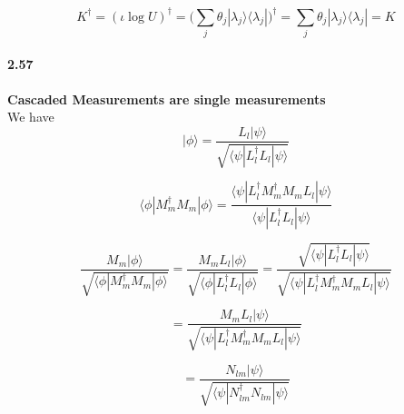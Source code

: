 $$ K^{\dagger} =  (\iota \log U)^{\dagger}  = \bigg( \sum_j \theta_j |\lambda_j\rangle \langle \lambda_j| \bigg)^{\dagger} = \sum_j \theta_j |\lambda_j\rangle \langle \lambda_j| = K$$

\paragraph{2.57} \textbf{Cascaded Measurements are single measurements}%
\\
We have 
$$ |\phi\rangle = \frac{ L_l |\psi\rangle}{\sqrt{\langle \psi| L_l^{\dagger } L_l | \psi\rangle}}$$

$$ \langle \phi| M_m^{\dagger} M_m|\phi \rangle = \frac{ \langle \psi| L_l^{\dagger }M_m^{\dagger} M_m L_l |\psi\rangle}{\langle \psi| L_l^{\dagger } L_l | \psi\rangle}$$

$$ \frac{M_m |\phi\rangle}{\sqrt{\langle \phi | M_m^{\dagger} M_m| \phi\rangle}} = \frac{M_m L_l |\phi\rangle}{\sqrt{\langle \phi |L_l^{\dagger} L_l| \phi\rangle}} = 
\frac{\sqrt{\langle \psi| L_l^{\dagger} L_l|\psi\rangle }}{\sqrt{\langle \psi |  L_l^{\dagger }M_m^{\dagger} M_m L_l |\psi\rangle}}$$

$$ = \frac{M_m L_l|\psi\rangle}{\sqrt{\langle \psi |  L_l^{\dagger }M_m^{\dagger} M_m L_l |\psi\rangle}}$$

$$ = \frac{N_{lm}|\psi\rangle}{\sqrt{\langle \psi | N_{lm}^{\dagger} N_{lm} |\psi\rangle}}$$
